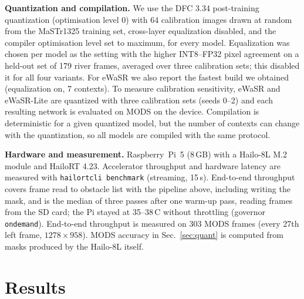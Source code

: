 \documentclass[conference]{IEEEtran}
\begin{document}
\textbf{Quantization and compilation.} We use the DFC 3.34 post-training quantization (optimisation level 0) with 64 calibration images drawn at random from the MaSTr1325 training set, cross-layer equalization disabled, and the compiler optimisation level set to maximum, for every model. Equalization was chosen per model as the setting with the higher INT8--FP32 pixel agreement on a held-out set of 179 river frames, averaged over three calibration sets; this disabled it for all four variants. For eWaSR we also report the fastest build we obtained (equalization on, 7 contexts). To measure calibration sensitivity, eWaSR and eWaSR-Lite are quantized with three calibration sets (seeds 0--2) and each resulting network is evaluated on MODS on the device. Compilation is deterministic for a given quantized model, but the number of contexts can change with the quantization, so all models are compiled with the same protocol.

\textbf{Hardware and measurement.} Raspberry~Pi~5 (8\,GB) with a Hailo-8L M.2 module and HailoRT 4.23. Accelerator throughput and hardware latency are measured with \texttt{hailortcli benchmark} (streaming, 15\,s). End-to-end throughput covers frame read to obstacle list with the pipeline above, including writing the mask, and is the median of three passes after one warm-up pass, reading frames from the SD card; the Pi stayed at 35--38\,\textdegree C without throttling (governor \texttt{ondemand}). End-to-end throughput is measured on 303 MODS frames (every 27th left frame, $1278\times958$). MODS accuracy in Sec.~\ref{sec:quant} is computed from masks produced by the Hailo-8L itself.

\section{Results}
\end{document}
